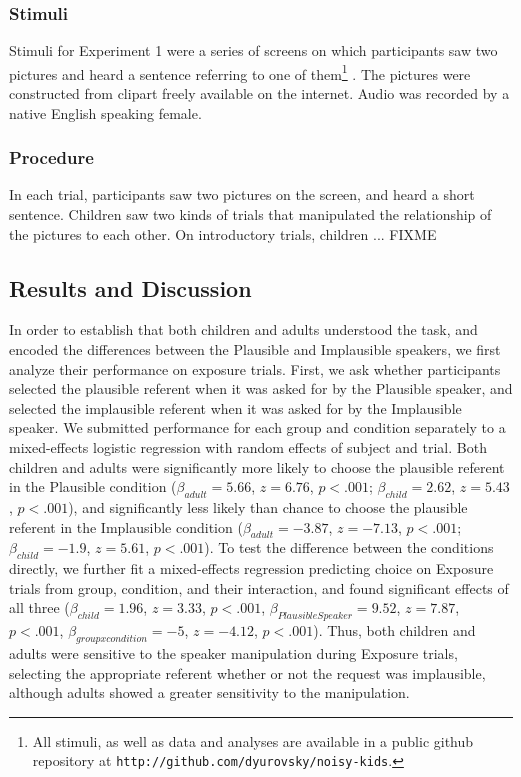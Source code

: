 \documentclass[man,floatsintext]{apa6}
\begin{document}
\subsubsection{Stimuli}

Stimuli for Experiment 1 were a series of screens on which participants saw two pictures and heard a sentence referring to one of them\footnote{All stimuli, as well as data and analyses are available in a public github repository at \small{\tt{http://github.com/dyurovsky/noisy-kids}}.} . The pictures were constructed from clipart freely available on the internet. Audio was recorded by a native English speaking female. 

\subsubsection{Procedure}

In each trial, participants saw two pictures on the screen, and heard a short sentence. Children saw two kinds of trials that manipulated the relationship of the pictures to each other. On introductory trials, children ... FIXME

\subsection{Results and Discussion}

In order to establish that both children and adults understood the task, and encoded the differences between the Plausible and Implausible speakers, we first analyze their performance on exposure trials. First, we ask whether participants selected the plausible referent when it was asked for by the Plausible speaker, and selected the implausible referent when it was asked for by the Implausible speaker. We submitted performance for each group and condition separately to a mixed-effects logistic regression with random effects of subject and trial. Both children and adults were significantly more likely to choose the plausible referent in the Plausible condition ($\beta_{adult} = 5.66$, $z = 6.76$, $p <.001$; $\beta_{child} = 2.62$, $z = 5.43$, $p <.001$), and significantly less likely than chance to choose the plausible referent in the Implausible condition ($\beta_{adult} = -3.87$, $z = -7.13$, $p <.001$; $\beta_{child} = -1.9$, $z = 5.61$, $p <.001$). To test the difference between the conditions directly, we further fit a mixed-effects regression predicting choice on Exposure trials from group, condition, and their interaction, and found significant effects of all three ($\beta_{child} = 1.96$,  $z = 3.33$, $p <.001$, $\beta_{Plausible Speaker} = 9.52$,  $z = 7.87$, $p <.001$,  $\beta_{group x condition} = -5$,  $z = -4.12$, $p <.001$). Thus, both children and adults were sensitive to the speaker manipulation during Exposure trials, selecting the appropriate referent whether or not the request was implausible, although adults showed a greater sensitivity to the manipulation.
\end{document}
